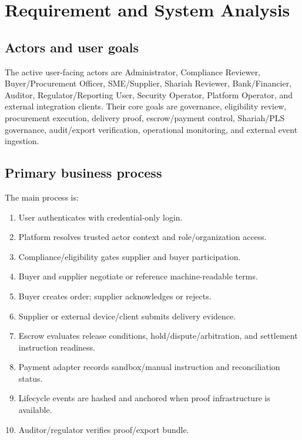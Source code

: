 \documentclass[11pt,a4paper]{article}
\begin{document}
\section{Requirement and System Analysis}

\subsection{Actors and user goals}

The active user-facing actors are Administrator, Compliance Reviewer, Buyer/Procurement Officer, SME/Supplier, Shariah Reviewer, Bank/Financier, Auditor, Regulator/Reporting User, Security Operator, Platform Operator, and external integration clients. Their core goals are governance, eligibility review, procurement execution, delivery proof, escrow/payment control, Shariah/PLS governance, audit/export verification, operational monitoring, and external event ingestion.

\subsection{Primary business process}

The main process is:

\begin{enumerate}
  \item User authenticates with credential-only login.
  \item Platform resolves trusted actor context and role/organization access.
  \item Compliance/eligibility gates supplier and buyer participation.
  \item Buyer and supplier negotiate or reference machine-readable terms.
  \item Buyer creates order; supplier acknowledges or rejects.
  \item Supplier or external device/client submits delivery evidence.
  \item Escrow evaluates release conditions, hold/dispute/arbitration, and settlement instruction readiness.
  \item Payment adapter records sandbox/manual instruction and reconciliation status.
  \item Lifecycle events are hashed and anchored when proof infrastructure is available.
  \item Auditor/regulator verifies proof/export bundle.
\end{enumerate}
\end{document}

